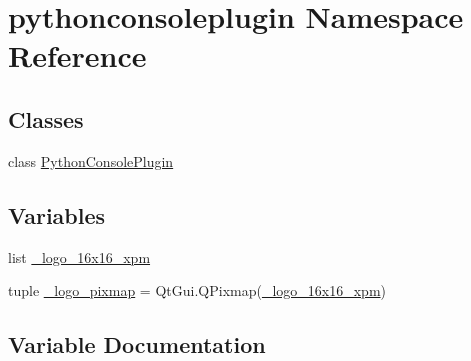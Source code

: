 \hypertarget{namespacepythonconsoleplugin}{}\section{pythonconsoleplugin Namespace Reference}
\label{namespacepythonconsoleplugin}
\subsection*{Classes}
\begin{DoxyCompactItemize}
\item 
class \hyperlink{classpythonconsoleplugin_1_1PythonConsolePlugin}{Python\+Console\+Plugin}
\end{DoxyCompactItemize}
\subsection*{Variables}
\begin{DoxyCompactItemize}
\item 
list \hyperlink{namespacepythonconsoleplugin_a69558d69b1fb166043278bdd6c845d06}{\+\_\+logo\+\_\+16x16\+\_\+xpm}
\item 
tuple \hyperlink{namespacepythonconsoleplugin_aa58b9949a93d906f4875f89856c08a1a}{\+\_\+logo\+\_\+pixmap} = Qt\+Gui.\+Q\+Pixmap(\hyperlink{namespacepythonconsoleplugin_a69558d69b1fb166043278bdd6c845d06}{\+\_\+logo\+\_\+16x16\+\_\+xpm})
\end{DoxyCompactItemize}


\subsection{Variable Documentation}
\hypertarget{namespacepythonconsoleplugin_a69558d69b1fb166043278bdd6c845d06}{}
